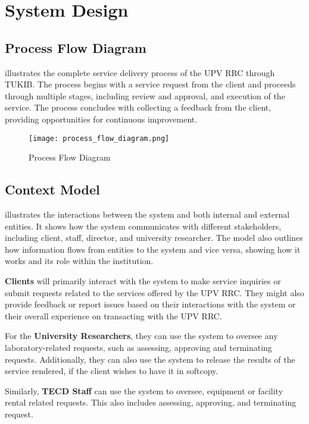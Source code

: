 \section{System Design}

\subsection{Process Flow Diagram}

 illustrates the complete service delivery process of the UPV RRC through TUKIB. The process begins with a service request from the client and proceeds through multiple stages, including review and approval, and execution of the service. The process concludes with collecting a feedback from the client, providing opportunities for continuous improvement.

\begin{figure}[h]
	\centering 
	\texttt{[image: process\_flow\_diagram.png]}
	\caption{Process Flow Diagram}
	\label{fig:process_flow}
\end{figure}

\subsection{Context Model}

 illustrates the interactions between the system and both internal and external entities. It shows how the system communicates with different stakeholders, including client, staff, director, and university researcher. The model also outlines how information flows from entities to the system and vice versa, showing how it works and its role within the institution.

\textbf{Clients} will primarily interact with the system to make service inquiries or submit requests related to the services offered by the UPV RRC. They might also provide feedback or report issues based on their interactions with the system or their overall experience on transacting with the UPV RRC.

For the \textbf{University Researchers}, they can use the system to oversee any laboratory-related requests, such as assessing, approving and terminating requests. Additionally, they can also use the system to release the results of the service rendered, if the client wishes to have it in softcopy. 

Similarly, \textbf{TECD Staff} can use the system to oversee, equipment or facility rental related requests. This also includes assessing, approving, and terminating request. 

